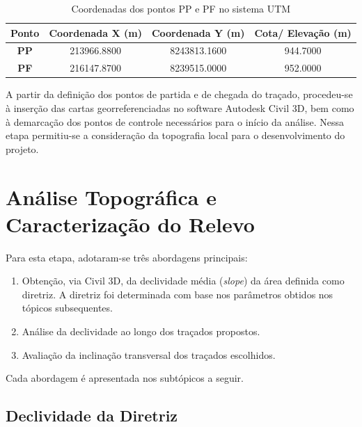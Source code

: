 \begin{table}[h]
    
    \caption{Coordenadas dos pontos PP e PF no sistema UTM}\label{tab:tab_1}
    \begin{tabular}{|c|c|c|c|}
        \hline
        Ponto       & \textbf{Coordenada X (m)} & \textbf{Coordenada Y (m)} & \textbf{Cota/ Elevação (m)} \\ \hline
        \textbf{PP} & 213966.8800               & 8243813.1600              & 944.7000                    \\ \hline
        \textbf{PF} & 216147.8700               & 8239515.0000              & 952.0000                    \\ \hline
    \end{tabular}
\end{table}


A partir da definição dos pontos de partida e de chegada do traçado, procedeu-se à 
inserção das cartas georreferenciadas no software Autodesk Civil 3D, bem como à 
demarcação dos pontos de controle necessários para o início da análise. Nessa etapa 
permitiu-se a consideração da topografia local para o desenvolvimento do projeto. 







\section{Análise Topográfica e Caracterização do Relevo}

Para esta etapa, adotaram-se três abordagens principais:
\begin{enumerate}
    \item Obtenção, via Civil 3D, da declividade média (\textit{slope}) da área definida como diretriz. A diretriz foi determinada com base nos parâmetros obtidos nos tópicos subsequentes.
    \item Análise da declividade ao longo dos traçados propostos.
    \item Avaliação da inclinação transversal dos traçados escolhidos.
\end{enumerate}

Cada abordagem é apresentada nos subtópicos a seguir.

\subsection{Declividade da Diretriz}

